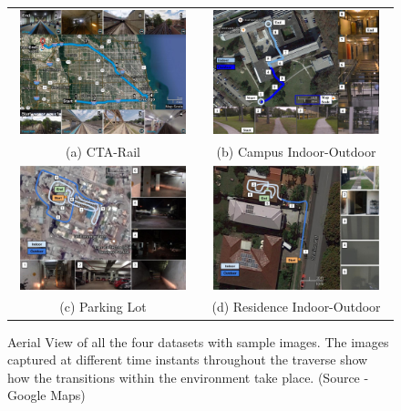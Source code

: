 \documentclass[letterpaper, 10 pt, conference]{ieeeconf}  %
\begin{document}
\begin{figure}[htbp]
\centering
\begin{tabular*}{\textwidth}{cc}
 \includegraphics[width=7cm,height=3.6cm]{cta-datasetTrajSampleImages} &
 \hspace{2cm}
 \includegraphics[width=7cm,height=3.6cm]{campus-datasetTrajSampleImages} \\
 (a) CTA-Rail & \hspace{2cm}(b) Campus Indoor-Outdoor \\
 \includegraphics[width=7cm,height=3.6cm]{Parking_Amrapali-Map-Images} &
 \hspace{2cm}
 \includegraphics[width=7cm,height=3.6cm]{Residence-IO-Map-Images} \\
 (c) Parking Lot & \hspace{2cm}(d) Residence Indoor-Outdoor \\
\end{tabular*}
 \caption{Aerial View of all the four datasets with sample images. The images captured at different time instants throughout the traverse show how the transitions within the environment take place. (Source - Google Maps)}
 \label{fig:datasetAerialTraj}
\end{figure}
\end{document}

